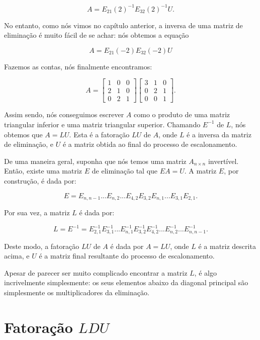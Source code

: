 \begin{Example}
	$$
	A = E_{21}(2)^{-1}E_{32}(2)^{-1}U.
	$$
	
	No entanto, como nós vimos no capítulo anterior, a inversa de uma matriz de eliminação é muito fácil de se achar: nós obtemos a equação
	
	$$
	A = E_{21}(-2)E_{32}(-2)U
	$$
	
	Fazemos as contas, nós finalmente encontramos:
	
	$$
	A = \begin{bmatrix}
		1 & 0 & 0 \\
		2 & 1 & 0 \\
		0 & 2 & 1
	\end{bmatrix}
	\begin{bmatrix}
		3 & 1 & 0 \\
		0 & 2 & 1 \\
		0 & 0 & 1
	\end{bmatrix}.
	$$
	
	Assim sendo, nós conseguimos escrever $A$ como o produto de uma matriz triangular inferior e uma matriz triangular superior. Chamando $E^{-1}$ de $L$, nós obtemos que $A = LU$. Esta é a fatoração $LU$ de $A$, onde $L$ é a inversa da matriz de eliminação, e $U$ é a matriz obtida ao final do processo de escalonamento.
\end{Example}

De uma maneira geral, suponha que nós temos uma matriz $A_{n\times n}$ invertível. Então, existe uma matriz $E$ de eliminação tal que $EA = U$. A matriz $E$, por construção, é dada por:

$$
E = E_{n, n - 1}...E_{n, 2}...E_{4, 2}E_{3, 2}E_{n, 1}...E_{3, 1}E_{2, 1}.
$$

Por sua vez, a matriz $L$ é dada por:

$$
L = E^{-1} = E_{2, 1}^{-1}E_{3, 1}^{-1}...E_{n, 1}^{-1}E_{3, 2}^{-1}E_{4, 2}^{-1}...E_{n, 2}^{-1}...E_{n, n - 1}^{-1}.
$$

Deste modo, a fatoração $LU$ de $A$ é dada por $A = LU$, onde $L$ é a matriz descrita acima, e $U$ é a matriz final resultante do processo de escalonamento.

Apesar de parecer ser muito complicado encontrar a matriz $L$, é algo incrivelmente simplesmente: os seus elementos abaixo da diagonal principal são simplesmente os multiplicadores da eliminação.

\section{Fatoração \texorpdfstring{$LDU$}{LDU}}


